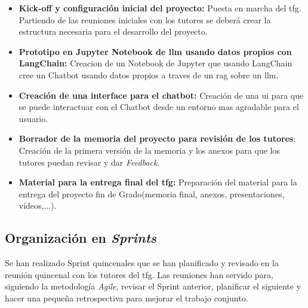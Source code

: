 \begin{itemize}

    \item \textbf{Kick-off y configuración inicial del proyecto:} Puesta en marcha del \acrshort{tfg}. Partiendo de las reuniones iniciales con los tutores se deberá crear la estructura necesaria para el desarrollo del proyecto.
    
    \item \textbf{Prototipo en Jupyter Notebook de \acrshort{llm} usando datos propios con LangChain:} Creacion de un Notebook de Jupyter que usando LangChain cree un Chatbot usando datos propios a traves de un \acrshort{rag} sobre un \acrshort{llm}.

    \item \textbf{Creación de una interface para el chatbot:} Creación de una \acrshort{ui} para que se puede interactuar con el Chatbot desde un entorno mas agradable para el usuario.

    \item \textbf{Borrador de la memoria del proyecto para revisión de los tutores}: Creación de la primera versión de la memoria y los anexos para que los tutores puedan revisar y dar \textit{Feedback}.

    \item \textbf{Material para la entrega final del \acrshort{tfg}:} Preparación del material para la entrega del proyecto fin de Grado(memoria final, anexos, presentaciones, vídeos,...).
\end{itemize}

\subsection{Organización en \textit{Sprints}}

Se han realizado Sprint quincenales que se han planificado y revisado en la reunión quincenal con los tutores del \acrshort{tfg}. Las reuniones han servido para, siguiendo la metodología \textit{Agile}, revisar el Sprint anterior, planificar el siguiente y hacer una pequeña retrospectiva para mejorar el trabajo conjunto.


